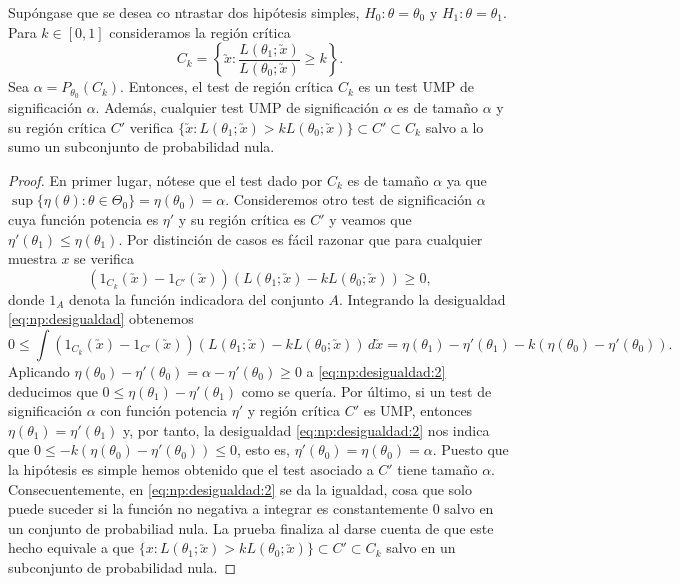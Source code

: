        \begin{thm} \label{thm:np:1}
            Supóngase que se desea co   ntrastar dos hipótesis simples, $H_0 : \theta = \theta_0$ y $H_1 : \theta = \theta_1$. Para $k \in [0,1]$ consideramos la región crítica
            \[C_k = \left\{\utilde{x}: \frac{L(\theta_1;\utilde{x})}{L(\theta_0;\utilde{x})} \ge k\right\}.\]
            Sea $\alpha = P_{\theta_0}(C_k)$. Entonces, el test de región crítica $C_k$ es un test UMP de significación $\alpha$. Además, cualquier test UMP de significación $\alpha$ es de tamaño $\alpha$ y su región crítica $C'$ verifica $\{\utilde{x}: L(\theta_1;\utilde{x}) > k L(\theta_0;\utilde{x})\} \subset C' \subset C_k$ salvo a lo sumo un subconjunto de probabilidad nula.
        \end{thm}
        \begin{proof}
            En primer lugar, nótese que el test dado por $C_k$ es de tamaño $\alpha$ ya que $\sup\{ \eta(\theta) : \theta \in \Theta_0\} = \eta(\theta_0) = \alpha$. Consideremos otro test de significación $\alpha$ cuya función potencia es $\eta'$ y su región crítica es $C'$ y veamos que $\eta'(\theta_1) \le \eta(\theta_1)$. Por distinción de casos es fácil razonar que para cualquier muestra $x$ se verifica
            \begin{equation} \label{eq:np:desigualdad}
                (1_{C_k}(\utilde{x})-1_{C'}(\utilde{x})) (L(\theta_1; \utilde{x}) - k L(\theta_0; \utilde{x})) \ge 0,
            \end{equation}
            donde $1_A$ denota la función indicadora del conjunto $A$. Integrando la desigualdad \eqref{eq:np:desigualdad} obtenemos
            \begin{equation} \label{eq:np:desigualdad:2}
                0 \le \int(1_{C_k}(\utilde{x})-1_{C'}(\utilde{x})) (L(\theta_1; \utilde{x}) - k L(\theta_0; \utilde{x})) \, d\utilde{x} = \eta(\theta_1) - \eta'(\theta_1) - k (\eta(\theta_0) - \eta'(\theta_0)).
            \end{equation}
            Aplicando $\eta(\theta_0) - \eta'(\theta_0) = \alpha  - \eta'(\theta_0) \ge 0$ a \eqref{eq:np:desigualdad:2} deducimos que $0 \le \eta(\theta_1) - \eta'(\theta_1)$ como se quería. Por último, si un test de significación $\alpha$ con función potencia $\eta'$ y región crítica $C'$ es UMP, entonces $\eta(\theta_1) = \eta'(\theta_1)$ y, por tanto, la desigualdad \eqref{eq:np:desigualdad:2} nos indica que $0 \le -k(\eta(\theta_0) - \eta'(\theta_0)) \le 0$, esto es, $\eta'(\theta_0) = \eta(\theta_0) = \alpha$. Puesto que la hipótesis es simple hemos obtenido que el test asociado a $C'$ tiene tamaño $\alpha$. Consecuentemente, en \eqref{eq:np:desigualdad:2} se da la igualdad, cosa que solo puede suceder si la función no negativa a integrar es constantemente 0 salvo en un conjunto de probabiliad nula. La prueba finaliza al darse cuenta de que este hecho equivale a que $\{x: L(\theta_1;\utilde{x}) > k L(\theta_0;\utilde{x})\} \subset C' \subset C_k$ salvo en un subconjunto de probabilidad nula.
        \end{proof}

